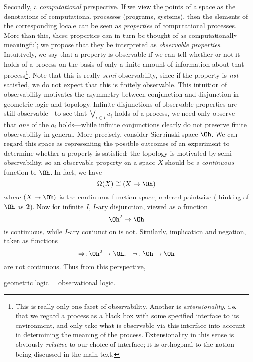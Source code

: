 Secondly, a {\em computational} perspective.
If we view the points of a space as the denotations of computational processes 
(programs, systems), then the elements of the corresponding locale can be 
seen as {\em properties} of computational processes.
More than this, these properties can in turn be thought of as computationally meaningful; we propose that they be interpreted as {\em observable properties}.
Intuitively, we say that a property is observable if we can tell whether or not it holds of a process on the basis of only a finite amount of information about that process\footnote{This is really only one facet of observability. Another
is {\em extensionality}, i.e. that we regard a process as a black box with
some specified interface to its environment, and only take what is observable
via this interface into account in determining the meaning of the process.
Extensionality in this sense is obviously {\em relative} to our choice of 
interface;
it is orthogonal to the notion being discussed in the main text.}.
Note that this is really {\em semi}-observability, since if the property is {\em not} satisfied, we do not expect that this is finitely observable.
This intuition of observability  motivates the asymmetry between conjunction and disjunction in geometric logic and topology.
Infinite disjunctions of observable properties are still observable---to see that $\bigvee_{i \in I} a_{i}$ holds of a process, we need only observe that {\em one} of the $a_{i}$ holds---while infinite conjunctions clearly do not preserve finite observability in general.
More precisely, consider Sierpinski space $\Oh$.
We can regard this space as representing the possible outcomes of an experiment to determine whether a property is satisfied; the topology is motivated by semi-observability, so an observable property on a space $X$ should be a {\em continuous} function to $\Oh$.
In fact, we have
\[ \Omega (X) \cong (X \rightarrow \Oh ) \]
where $(X \rightarrow \Oh )$ is the continuous function space, ordered pointwise (thinking of $\Oh$ as {\bf 2}).
Now for infinite $I$, $I$-ary disjunction, viewed as a function
\[ \Oh^{I} \rightarrow \Oh \]
is continuous, while $I$-ary conjunction is not.
Similarly, implication and negation, taken as functions
\[ \Rightarrow : \Oh^{2} \rightarrow \Oh , \;\;\; \neg : \Oh \rightarrow \Oh \]
are not continuous.
Thus from this perspective,
\begin{center}
geometric logic = observational logic.
\end{center}

